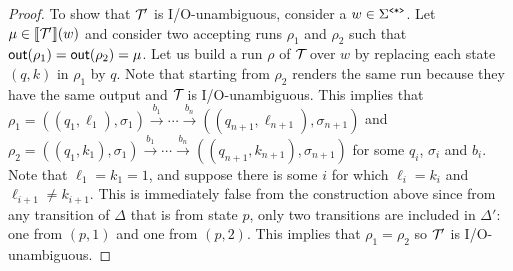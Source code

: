 \begin{proof}
	To show that $\mathcal{T}\!'$ is I/O-unambiguous, consider a $w\in \Sigma^{\texttt{<*>}}$. Let $\mu \in \llbracket \mathcal{T}\!' \rrbracket(w)$ and consider two accepting runs $\rho_1$ and $\rho_2$ such that $\textsf{out}(\rho_1) = \textsf{out}(\rho_2) = \mu$. Let us build a run $\rho$ of $\mathcal{T}\!$ over $w$ by replacing each state $(q, k)$ in $\rho_1$ by $q$. Note that starting from $\rho_2$ renders the same run because they have the same output and $\mathcal{T}\!$ is I/O-unambiguous.  
	This implies that $\rho_1 = ((q_1,\ell_1), \sigma_1) \xrightarrow{b_1} \cdots  \xrightarrow{b_n} ((q_{n+1}, \ell_{n+1}), \sigma_{n+1})$ and $\rho_2 = ((q_1, k_1), \sigma_1) \xrightarrow{b_1} \cdots  \xrightarrow{b_n} ((q_{n+1}, k_{n+1}), \sigma_{n+1})$ for some $q_i$, $\sigma_i$ and $b_i$. Note that $\ell_1 = k_1 = 1$, and suppose there is some $i$ for which $\ell_i = k_i$ and $\ell_{i+1} \neq k_{i+1}$. This is immediately false from the construction above since from any transition of $\Delta$ that is from state $p$, only two transitions are included in $\Delta'$: one from $(p,1)$ and one from $(p,2)$. This implies that $\rho_1 = \rho_2$ so $\mathcal{T}\!'$ is I/O-unambiguous. 
\end{proof}